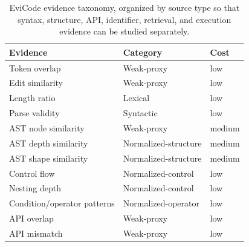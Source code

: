 \begin{table}[!htbp]
\centering
\scriptsize
\begin{tabular}{lll}
\toprule
Evidence & Category & Cost \\
\midrule
Token overlap & Weak-proxy & low \\
Edit similarity & Weak-proxy & low \\
Length ratio & Lexical & low \\
Parse validity & Syntactic & low \\
AST node similarity & Weak-proxy & medium \\
AST depth similarity & Normalized-structure & medium \\
AST shape similarity & Normalized-structure & medium \\
Control flow & Normalized-control & low \\
Nesting depth & Normalized-control & low \\
Condition/operator patterns & Normalized-operator & low \\
API overlap & Weak-proxy & low \\
API mismatch & Weak-proxy & low \\
\bottomrule
\end{tabular}
\vspace{0.5em}
\caption{EviCode evidence taxonomy, organized by source type so that syntax, structure, API, identifier, retrieval, and execution evidence can be studied separately.}
\label{tab:evidence-taxonomy}
\end{table}
